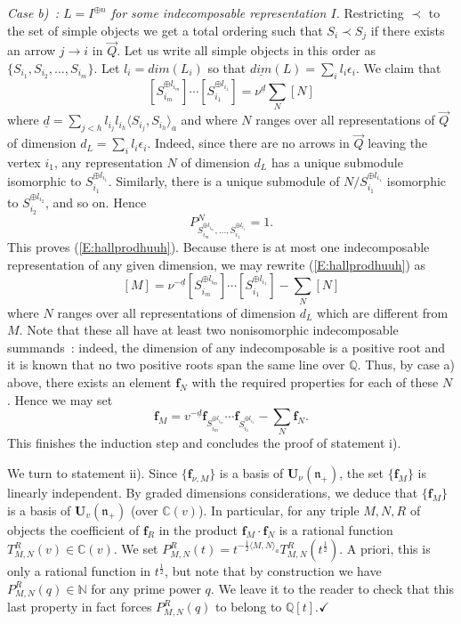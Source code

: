 \documentclass[a4paper,10pt]{amsart}
\def\Q{\mathbb{Q}}
\def\U{\mathbf{U}}
\def\qed{$\hfill \checkmark$}
\def\N{\mathbb{N}}
\def\C{\mathbb{C}}
\def\n{\mathfrak{n}}
\numberwithin{equation}{section}
\begin{document}
\noindent
\textit{Case b)~: $L=I^{\oplus n}$ for some indecomposable representation $I$.} Restricting $\prec$ to the set of simple objects we get a total ordering such that $S_i \prec S_j$ if there exists an arrow $j \to i$ in $\vec{Q}$. Let us write all simple objects in this order as $\{S_{i_1}, S_{i_2}, \ldots, S_{i_m}\}$.
Let $l_i={dim}(L_i)$ so that ${\underline{dim}}(L)=\sum_i l_i \epsilon_i$. We claim that
\begin{equation}\label{E:hallprodhuuh}
[S_{i_m}^{\oplus l_{i_m}}] \cdots [S_{i_1}^{\oplus l_{i_1}}]=\nu^{\underline{d}}\sum_N [N]
\end{equation}
where $\underline{d}=\sum_{j<h} l_{i_j}l_{i_h} \langle S_{i_j},S_{i_h} \rangle_a$ and where $N$ ranges over all representations of $\vec{Q}$ of dimension $d_L=\sum_i l_i \epsilon_i$. Indeed, since there are no arrows in $\vec{Q}$ leaving the vertex $i_1$, any representation $N$ of dimension $d_L$ has a unique submodule isomorphic to $S_{i_1}^{\oplus l_{i_1}}$. Similarly, there is a unique submodule of $N/S_{i_1}^{\oplus l_{i_1}}$ isomorphic to $S_{i_2}^{\oplus l_{i_2}}$, and so on.
Hence
$$P^N_{S_{i_m}^{\oplus l_{i_m}}, \ldots, S_{i_1}^{\oplus l_{i_1}}}=1.$$
This proves (\ref{E:hallprodhuuh}).
Because there is at most one indecomposable representation of any given dimension,
we may rewrite (\ref{E:hallprodhuuh}) as
$$[M]=\nu^{-\underline{d}}[S_{i_m}^{\oplus l_{i_m}}] \cdots [S_{i_1}^{\oplus l_{i_1}}] -\sum_N [N]$$
where $N$ ranges over all representations of dimension $d_L$ which are different from $M$. Note that these all have at least two nonisomorphic indecomposable summands~: indeed,
the dimension of any indecomposable is a positive root and it is known that no two positive roots span the same line over $\Q$. Thus, by case a) above, there exists an element
$\mathbf{f}_{N}$ with  the required properties for each of these $N$. Hence we may set
$$\mathbf{f}_{M}=v^{-\underline{d}}\mathbf{f}_{S_{i_m}^{\oplus l_{i_m}}} \cdots \mathbf{f}_{S_{i_1}^{\oplus l_{i_1}}}-\sum_N \mathbf{f}_{N}.$$
This finishes the induction step and concludes the proof of statement i).

\vspace{.1in}

We turn to statement ii). Since $\{\mathbf{f}_{\nu,M}\}$ is a basis of
$\U_{\nu}(\n_+)$, the set $\{\mathbf{f}_{M}\}$ is linearly independent. By graded dimensions considerations, we deduce that $\{\mathbf{f}_M\}$ is a basis of $\U_v(\n_+)$ (over $\C(v)$). In particular, for any triple $M,N,R$ of objects the coefficient of $\mathbf{f}_R$ in the product $\mathbf{f}_M \cdot \mathbf{f}_N$ is a rational function $T_{M,N}^R(v) \in \C(v)$. We set $P_{M,N}^R(t)=t^{-\frac{1}{2}\langle M,N\rangle_a}T_{M,N}^R(t^{\frac{1}{2}})$. A priori, this is only a rational function in $t^{\frac{1}{2}}$, but note that by construction we have $P_{M,N}^R(q) \in \N$ for any prime power $q$. We leave it to the reader to check that this last property in fact forces $P_{M,N}^R(q)$ to belong to $\Q[t]$.\qed
\end{document}
